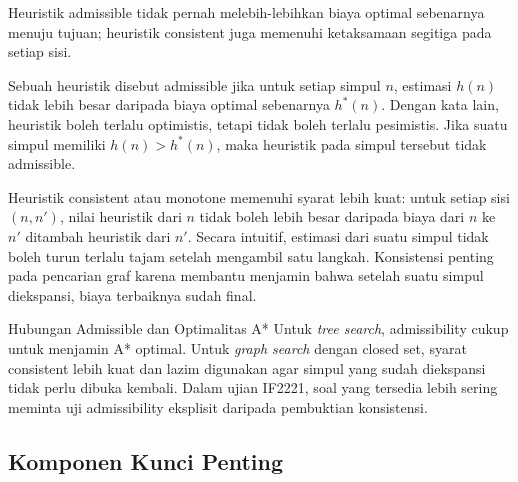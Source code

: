 \begin{jawab}
Heuristik admissible tidak pernah melebih-lebihkan biaya optimal sebenarnya menuju tujuan; heuristik consistent juga memenuhi ketaksamaan segitiga pada setiap sisi.
\end{jawab}

Sebuah heuristik disebut admissible jika untuk setiap simpul $n$, estimasi $h(n)$ tidak lebih besar daripada biaya optimal sebenarnya $h^*(n)$. Dengan kata lain, heuristik boleh terlalu optimistis, tetapi tidak boleh terlalu pesimistis. Jika suatu simpul memiliki $h(n)>h^*(n)$, maka heuristik pada simpul tersebut tidak admissible.

Heuristik consistent atau monotone memenuhi syarat lebih kuat: untuk setiap sisi $(n,n')$, nilai heuristik dari $n$ tidak boleh lebih besar daripada biaya dari $n$ ke $n'$ ditambah heuristik dari $n'$. Secara intuitif, estimasi dari suatu simpul tidak boleh turun terlalu tajam setelah mengambil satu langkah. Konsistensi penting pada pencarian graf karena membantu menjamin bahwa setelah suatu simpul diekspansi, biaya terbaiknya sudah final.

\begin{cmt}{Hubungan Admissible dan Optimalitas A*}{}
Untuk \textit{tree search}, admissibility cukup untuk menjamin A* optimal. Untuk \textit{graph search} dengan closed set, syarat consistent lebih kuat dan lazim digunakan agar simpul yang sudah diekspansi tidak perlu dibuka kembali. Dalam ujian IF2221, soal yang tersedia lebih sering meminta uji admissibility eksplisit daripada pembuktian konsistensi.
\end{cmt}

\subsection{Komponen Kunci Penting}

